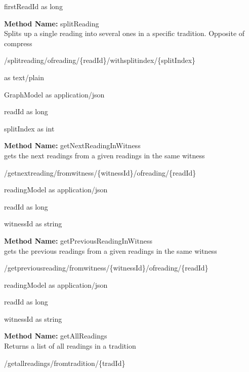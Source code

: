 \begin{parameter}
firstReadId as long
\end{parameter}
\textbf{Method Name: }splitReading \\ Splits up a single reading into several ones in a specific tradition. Opposite of compress
\begin{post}
/splitreading/ofreading/\{readId\}/withsplitindex/\{splitIndex\}
\end{post}
\begin{request}
 as text/plain
\end{request}
\begin{response}
GraphModel as application/json
\end{response}
\begin{parameter}
readId as long
\end{parameter}
\begin{parameter}
splitIndex as int
\end{parameter}
\textbf{Method Name: }getNextReadingInWitness \\ gets the next readings from a given readings in the same witness
\begin{get}
/getnextreading/fromwitness/\{witnessId\}/ofreading/\{readId\}
\end{get}
\begin{response}
readingModel as application/json
\end{response}
\begin{parameter}
readId as long
\end{parameter}
\begin{parameter}
witnessId as string
\end{parameter}
\textbf{Method Name: }getPreviousReadingInWitness \\ gets the previous readings from a given readings in the same witness
\begin{get}
/getpreviousreading/fromwitness/\{witnessId\}/ofreading/\{readId\}
\end{get}
\begin{response}
readingModel as application/json
\end{response}
\begin{parameter}
readId as long
\end{parameter}
\begin{parameter}
witnessId as string
\end{parameter}
\textbf{Method Name: }getAllReadings \\ Returns a list of all readings in a tradition
\begin{get}
/getallreadings/fromtradition/\{tradId\}
\end{get}
